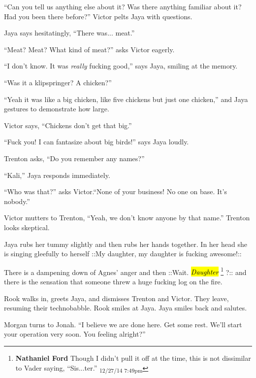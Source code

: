 ``Can you tell us anything else about it?  Was there anything familiar about it?  Had you been there before?'' Victor pelts Jaya with questions.

Jaya says hesitatingly, ``There was... meat.''

``Meat?  Meat?  What kind of meat?'' asks Victor eagerly.

``I don't know.  It was \textit{really} fucking good,'' says Jaya, smiling at the memory.

``Was it a klipspringer?  A chicken?''

``Yeah it was like a big chicken, like five chickens but just one chicken,'' and Jaya gestures to demonstrate how large.

Victor says, ``Chickens don't get that big.''

``Fuck you!  I can fantasize about big birds!'' says Jaya loudly.



Trenton asks, ``Do you remember any names?''

``Kali,'' Jaya responds immediately.

``Who was that?'' asks Victor.``None of your business!  No one on base.  It's nobody.''

Victor mutters to Trenton, ``Yeah, we don't know anyone by that name.'' Trenton looks skeptical.

Jaya rubs her tummy slightly and then rubs her hands together.  In her head she is singing gleefully to herself  {\color[RGB]{255,0,0}::My daughter, my daughter is fucking awesome!::} 

There is a dampening down of Agnes' anger and then  {\color[RGB]{74,134,232}::Wait. } \textit{ {\color[RGB]{74,134,232}\hl{Daughter}} }\footnote{\textbf{Nathaniel Ford }Though I didn't pull it off at the time, this is not dissimilar to Vader saying, ``Sis...ter.'' \textsubscript{12/27/14 7:49pm}} {\color[RGB]{74,134,232}?::}  and there is the sensation that someone threw a huge fucking log on the fire.



Rook walks in, greets Jaya, and dismisses Trenton and Victor.  They leave, resuming their technobabble.  Rook smiles at Jaya.  Jaya smiles back and salutes.





Morgan turns to Jonah.  ``I believe we are done here.  Get some rest.  We'll start your operation very soon.  You feeling alright?''

